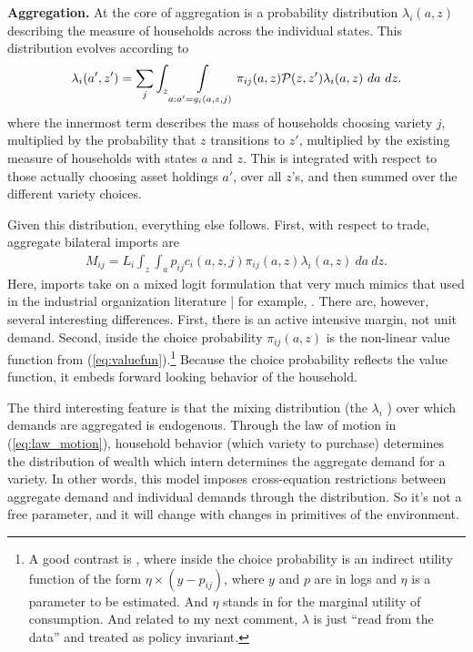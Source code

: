 \documentclass[12pt,pdftex]{article}
\begin{document}
\begin{onehalfspacing}
\textbf{Aggregation.} At the core of aggregation is a probability distribution $\lambda_{i}(a, z)$ describing the measure of households across the individual states. This distribution evolves according to
\begin{align}
\lambda_i(a', z') = \sum_{j} \int_{z}\int\displaylimits_{a: a' = g_{i}(a, z, j)} \pi_{ij}(a, z) \mathcal{P}(z, z') \lambda_i(a, z) \ da \ dz.
\label{eq:law_motion}
\end{align}
where the innermost term describes the mass of households choosing variety $j$, multiplied by the probability that $z$ transitions to $z'$, multiplied by the existing measure of households with states $a$ and $z$. This is integrated with respect to those actually choosing asset holdings $a'$, over all $z$'s, and then summed over the different variety choices.

Given this distribution, everything else follows. First, with respect to trade, aggregate bilateral imports are
\begin{align}
M_{ij} = L_i \int_{z} \int_{a}  p_{ij} c_{i}(a, z, j) \pi_{ij}(a, z) \lambda_i(a, z) \ da \ dz.
\label{eq:imports}
\end{align}
Here, imports take on a mixed logit formulation that very much mimics that used in the industrial organization literature | for example, \citet{berry1995automobile}. There are, however, several interesting differences. First, there is an active intensive margin, not unit demand. Second, inside the choice probability $\pi_{ij}(a, z)$ is the non-linear value function from (\ref{eq:valuefun}).\footnote{A good contrast is \citet{nevo2000practitioner}, where inside the choice probability is an indirect utility function of the form $\eta \times (y - p_{ij})$, where $y$ and $p$ are in logs and $\eta$ is a parameter to be estimated. And $\eta$ stands in for the marginal utility of consumption. And related to my next comment, $\lambda$ is just ``read from the data'' and treated as policy invariant.} Because the choice probability reflects the value function, it embeds forward looking behavior of the household.

The third interesting feature is that the mixing distribution (the $\lambda_{i}$ ) over which demands are aggregated is endogenous. Through the law of motion in (\ref{eq:law_motion}), household behavior (which variety to purchase) determines the distribution of wealth which intern determines the aggregate demand for a variety. In other words, this model imposes cross-equation restrictions between aggregate demand and individual demands through the distribution. So it's not a free parameter, and it will change with changes in primitives of the environment.


\end{onehalfspacing}
\end{document}
